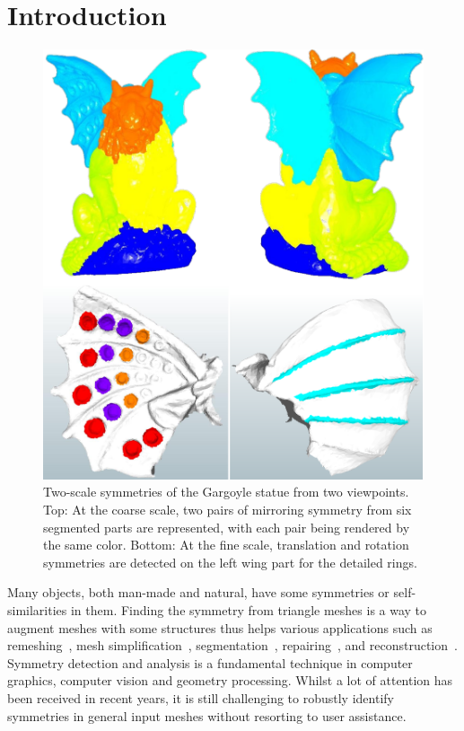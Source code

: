 \section{Introduction}
\label{sec:intro}

\begin{figure}[t]
\centering
  \includegraphics[width=0.99\linewidth]{figures/Gargoyl.pdf}
  \caption{Two-scale symmetries of the Gargoyle statue from two viewpoints.
  Top: At the coarse scale, two pairs of mirroring symmetry from six segmented parts are represented, with each pair being rendered by the same color.
  Bottom: At the fine scale, translation and rotation symmetries are detected on the left wing part for the detailed rings.}
\label{fig:Gargoyl}
\end{figure}

Many objects, both man-made and natural, have some symmetries or self-similarities in them.
Finding the symmetry from triangle meshes is a way to augment meshes with some structures thus helps various applications such as remeshing~\cite{podolak2006}, mesh simplification~\cite{pauly2008}, segmentation~\cite{mitra2006,xu2009}, repairing~\cite{bokeloh2009,berner2011}, and reconstruction~\cite{zabrodsky1997}.
Symmetry detection and analysis is a fundamental technique in computer graphics, computer vision and geometry processing.
Whilst a lot of attention has been received in recent years, it is still challenging to robustly identify symmetries in general input meshes without resorting to user assistance.

